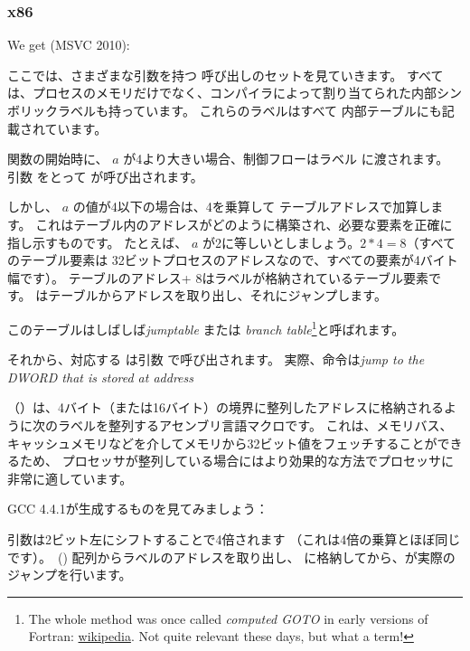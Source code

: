 ﻿\subsubsection{x86}


We get (MSVC 2010):




ここでは、さまざまな引数を持つ \printf 呼び出しのセットを見ていきます。
すべては、プロセスのメモリだけでなく、コンパイラによって割り当てられた内部シンボリックラベルも持っています。
これらのラベルはすべて  内部テーブルにも記載されています。

関数の開始時に、 $a$ が4より大きい場合、制御フローはラベル に渡されます。
引数 をとって \printf が呼び出されます。

しかし、 $a$ の値が4以下の場合は、4を乗算して テーブルアドレスで加算します。 
これはテーブル内のアドレスがどのように構築され、必要な要素を正確に指し示すものです。 
たとえば、 $a$ が2に等しいとしましょう。$2*4 = 8$（すべてのテーブル要素は
32ビットプロセスのアドレスなので、すべての要素が4バイト幅です）。
テーブルのアドレス+ 8はラベルが格納されているテーブル要素です。
\JMP はテーブルからアドレスを取り出し、それにジャンプします。

このテーブルはしばしば\emph{jumptable} または \emph{branch table}\footnote{The whole method was once called 
\emph{computed GOTO} in early versions of Fortran:
\href{http://en.wikipedia.org/wiki/Branch_table}{wikipedia}.
Not quite relevant these days, but what a term!}と呼ばれます。

それから、対応する \printf は引数 で呼び出されます。
実際、命令は\emph{jump to the DWORD that is stored at address} 

（）は、4バイト（または16バイト）の境界に整列したアドレスに格納されるように次のラベルを整列するアセンブリ言語マクロです。
これは、メモリバス、キャッシュメモリなどを介してメモリから32ビット値をフェッチすることができるため、
プロセッサが整列している場合にはより効果的な方法でプロセッサに非常に適しています。



\label{switch_lot_GCC}

GCC 4.4.1が生成するものを見てみましょう：




引数は2ビット左にシフトすることで4倍されます
（これは4倍の乗算とほぼ同じです）。~()
配列からラベルのアドレスを取り出し、 \EAX に格納してから、が実際のジャンプを行います。

